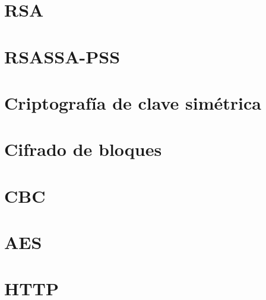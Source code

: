 
 \section{RSA}


 \section{RSASSA-PSS}


 \section{Criptografía de clave simétrica}


 \section{Cifrado de bloques}


 \section{CBC}


 \section{AES}


 \section{HTTP}
